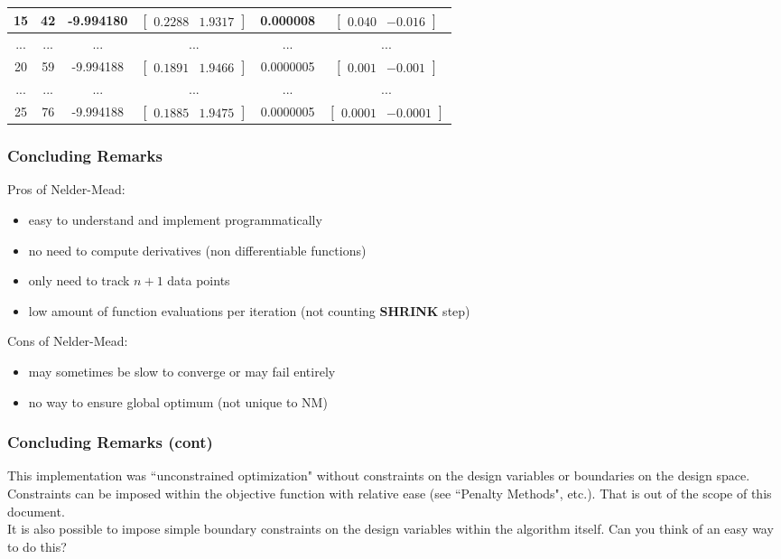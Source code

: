 \documentclass[aspectratio=169]{beamer}
\begin{document}
\begin{frame}
\begin{center}
\begin{tabular}{||c c c c||c c||}
			\hline
			15 & 42 & -9.994180 & $\begin{bmatrix} 0.2288 & 1.9317 \end{bmatrix}$ & 0.000008 & $\begin{bmatrix} 0.040 & -0.016 \end{bmatrix}$ \\ 
			\hline
			... & ... & ... & ... & ... & ... \\ 
			\hline
			20 & 59 & -9.994188 & $\begin{bmatrix} 0.1891 & 1.9466 \end{bmatrix}$ & 0.0000005 & $\begin{bmatrix} 0.001 & -0.001 \end{bmatrix}$ \\ 			
			\hline
			... & ... & ... & ... & ... & ... \\ 
			\hline
			25 & 76 & -9.994188 & $\begin{bmatrix} 0.1885 & 1.9475 \end{bmatrix}$ & 0.0000005 & $\begin{bmatrix} 0.0001 & -0.0001 \end{bmatrix}$ \\ 
			\hline
		\end{tabular}
		
		\end{center}
	\end{frame}

	\begin{frame}
		\frametitle{Concluding Remarks}
		Pros of Nelder-Mead:
		\begin{itemize}
			\item easy to understand and implement programmatically
			\item no need to compute derivatives (non differentiable functions)
			\item only need to track $n+1$ data points
			\item low amount of function evaluations per iteration (not counting \textbf{SHRINK} step)
		\end{itemize}
		\vspace{1cm}
		Cons of Nelder-Mead:
		\begin{itemize}
			\item may sometimes be slow to converge or may fail entirely
			\item no way to ensure global optimum (not unique to NM)
		\end{itemize}
	\end{frame}

	\begin{frame}
		\frametitle{Concluding Remarks (cont)}
			This implementation was ``unconstrained optimization" without constraints on the design variables or boundaries on the design space. Constraints can be imposed within the objective function with relative ease (see ``Penalty Methods", etc.). That is out of the scope of this document.
			\\[\baselineskip] 
			It is also possible to impose simple boundary constraints on the design variables within the algorithm itself. Can you think of an easy way to do this?
	\end{frame}
\end{document}
